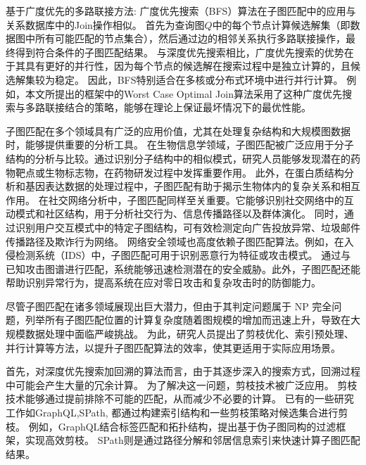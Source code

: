 基于广度优先的多路联接方法: 广度优先搜索（BFS）算法在子图匹配中的应用与关系数据库中的Join操作相似。
首先为查询图$Q$中的每个节点计算候选解集（即数据图中所有可能匹配的节点集合），然后通过边的相邻关系执行多路联接操作，最终得到符合条件的子图匹配结果。
与深度优先搜索相比，广度优先搜索的优势在于其具有更好的并行性，因为每个节点的候选解在搜索过程中是独立计算的，且候选解集较为稳定。
因此，BFS特别适合在多核或分布式环境中进行并行计算。
例如，本文所提出的框架中的Worst Case Optimal Join算法\cite{sm-bfs-DBLP:conf/focs/AtseriasGM08}采用了这种广度优先搜索与多路联接结合的策略，能够在理论上保证最坏情况下的最优性能。

子图匹配在多个领域具有广泛的应用价值，尤其在处理复杂结构和大规模图数据时，能够提供重要的分析工具。
在生物信息学领域，子图匹配被广泛应用于分子结构的分析与比较\cite{窦建凯2019单图中的近似频繁子图挖掘算法}。通过识别分子结构中的相似模式，研究人员能够发现潜在的药物靶点或生物标志物，在药物研发过程中发挥重要作用。
此外，在蛋白质结构分析和基因表达数据的处理过程中\cite{wang2023zerobind,biology-proteins-DBLP:journals/nar/XenariosSDHKE03,uniprot2017uniprot}，子图匹配有助于揭示生物体内的复杂关系和相互作用。
在社交网络分析中，子图匹配同样至关重要。它能够识别社交网络中的互动模式和社区结构，用于分析社交行为、信息传播路径以及群体演化\cite{wang2023mago}。
同时，通过识别用户交互模式中的特定子图结构，可有效检测定向广告投放异常、垃圾邮件传播路径及欺诈行为网络\cite{boshmaf2011socialbot,jiang2012isolating,wang2010don}。
网络安全领域也高度依赖子图匹配算法。例如，在入侵检测系统（IDS）中，子图匹配可用于识别恶意行为特征或攻击模式\cite{yuan2023motif}。
通过与已知攻击图谱进行匹配，系统能够迅速检测潜在的安全威胁。此外，子图匹配还能帮助识别异常行为，提高系统在应对零日攻击和复杂攻击时的防御能力。

尽管子图匹配在诸多领域展现出巨大潜力，但由于其判定问题属于 NP 完全问题，列举所有子图匹配位置的计算复杂度随着图规模的增加而迅速上升，导致在大规模数据处理中面临严峻挑战。
为此，研究人员提出了剪枝优化、索引预处理、并行计算等方法，以提升子图匹配算法的效率，使其更适用于实际应用场景。

首先，对深度优先搜索加回溯的算法而言，由于其逐步深入的搜索方式，回溯过程中可能会产生大量的冗余计算。
为了解决这一问题，剪枝技术被广泛应用。
剪枝技术能够通过提前排除不可能的匹配，从而减少不必要的计算。
已有的一些研究工作如GraphQL\cite{sm-GraphQL-DBLP:series/ads/HeS10},SPath\cite{sm-spath-DBLP:journals/pvldb/ZhaoH10},
都通过构建索引结构和一些剪枝策略对候选集合进行剪枝。
例如，GraphQL\cite{sm-GraphQL-DBLP:series/ads/HeS10}结合标签匹配和拓扑结构，提出基于伪子图同构的过滤框架，实现高效剪枝。
SPath\cite{sm-spath-DBLP:journals/pvldb/ZhaoH10}则是通过路径分解和邻居信息索引来快速计算子图匹配结果。

